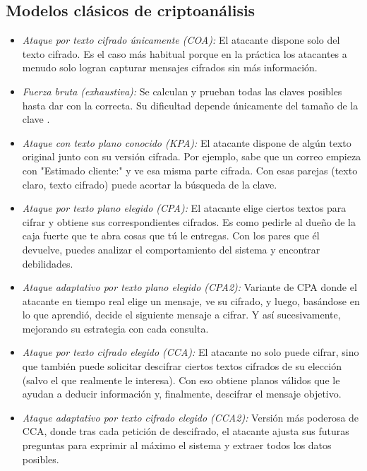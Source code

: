 \subsection{Modelos clásicos de criptoanálisis}

\begin{itemize}
  \item \emph{Ataque por texto cifrado únicamente (COA):} El atacante dispone solo del texto cifrado. Es el caso más habitual porque en la práctica los atacantes a menudo solo logran capturar mensajes cifrados sin más información.
  \item \emph{Fuerza bruta (exhaustiva):} Se calculan y prueban todas las claves posibles hasta dar con la correcta. Su dificultad depende únicamente del tamaño de la clave \cite{cryptography_attacks_6_types_and_prevention}\cite{types_of_cryptographic_attacks_to_know}.
  \item \emph{Ataque con texto plano conocido (KPA):} El atacante dispone de algún texto original junto con su versión cifrada. Por ejemplo, sabe que un correo empieza con "Estimado cliente:" y ve esa misma parte cifrada. Con esas parejas (texto claro, texto cifrado) puede acortar la búsqueda de la clave.
  \item \emph{Ataque por texto plano elegido (CPA):} El atacante elige ciertos textos para cifrar y obtiene sus correspondientes cifrados. Es como pedirle al dueño de la caja fuerte que te abra cosas que tú le entregas. Con los pares que él devuelve, puedes analizar el comportamiento del sistema y encontrar debilidades.
  \item \emph{Ataque adaptativo por texto plano elegido (CPA2):} Variante de CPA donde el atacante en tiempo real elige un mensaje, ve su cifrado, y luego, basándose en lo que aprendió, decide el siguiente mensaje a cifrar. Y así sucesivamente, mejorando su estrategia con cada consulta.
  \item \emph{Ataque por texto cifrado elegido (CCA):} El atacante no solo puede cifrar, sino que también puede solicitar descifrar ciertos textos cifrados de su elección (salvo el que realmente le interesa). Con eso obtiene planos válidos que le ayudan a deducir información y, finalmente, descifrar el mensaje objetivo.
  \item \emph{Ataque adaptativo por texto cifrado elegido (CCA2):} Versión más poderosa de CCA, donde tras cada petición de descifrado, el atacante ajusta sus futuras preguntas para exprimir al máximo el sistema y extraer todos los datos posibles.
\end{itemize}

